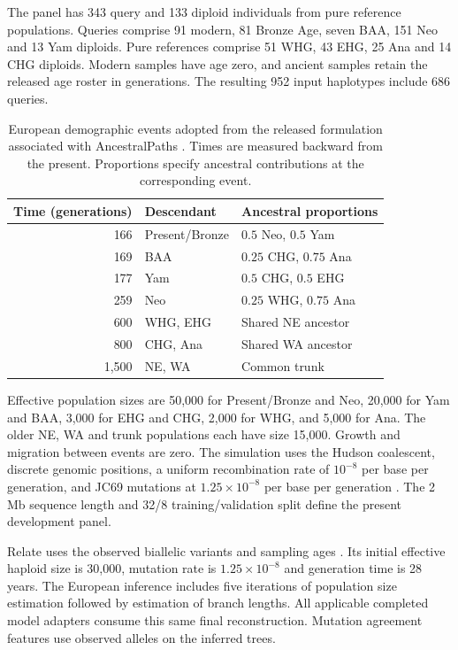\documentclass[letterpaper]{article}
\begin{document}
The panel has 343 query and 133 diploid individuals from pure reference populations. Queries comprise 91 modern, 81 Bronze Age, seven BAA, 151 Neo and 13 Yam diploids. Pure references comprise 51 WHG, 43 EHG, 25 Ana and 14 CHG diploids. Modern samples have age zero, and ancient samples retain the released age roster in generations. The resulting 952 input haplotypes include 686 queries.

\begin{table}[!htbp]
\centering
\small
\begin{tabular}{@{}rll@{}}
\toprule
Time (generations) & Descendant & Ancestral proportions\\
\midrule
166 & Present/Bronze & $0.5$ Neo, $0.5$ Yam\\
169 & BAA & $0.25$ CHG, $0.75$ Ana\\
177 & Yam & $0.5$ CHG, $0.5$ EHG\\
259 & Neo & $0.25$ WHG, $0.75$ Ana\\
600 & WHG, EHG & Shared NE ancestor\\
800 & CHG, Ana & Shared WA ancestor\\
1,500 & NE, WA & Common trunk\\
\bottomrule
\end{tabular}
\caption{European demographic events adopted from the released formulation associated with AncestralPaths \citep{eurasians2024}. Times are measured backward from the present. Proportions specify ancestral contributions at the corresponding event.}
\label{tab:demography}
\end{table}

Effective population sizes are 50,000 for Present/Bronze and Neo, 20,000 for Yam and BAA, 3,000 for EHG and CHG, 2,000 for WHG, and 5,000 for Ana. The older NE, WA and trunk populations each have size 15,000. Growth and migration between events are zero. The simulation uses the Hudson coalescent, discrete genomic positions, a uniform recombination rate of $10^{-8}$ per base per generation, and JC69 mutations at $1.25\times10^{-8}$ per base per generation \citep{msprime2022}. The 2\,Mb sequence length and 32/8 training/validation split define the present development panel.

Relate uses the observed biallelic variants and sampling ages \citep{relate2019}. Its initial effective haploid size is 30,000, mutation rate is $1.25\times10^{-8}$ and generation time is 28 years. The European inference includes five iterations of population size estimation followed by estimation of branch lengths. All applicable completed model adapters consume this same final reconstruction. Mutation agreement features use observed alleles on the inferred trees.
\end{document}
